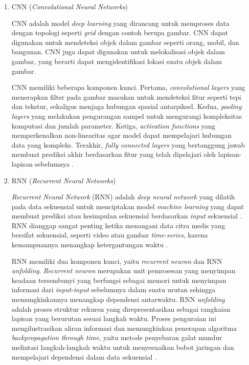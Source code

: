\begin{enumerate}
	\item CNN (\textit{Convolutional Neural Networks})
	
	CNN adalah model \textit{deep learning} yang dirancang untuk memproses data dengan topologi seperti \textit{grid} dengan contoh berupa gambar. CNN dapat digunakan untuk mendeteksi objek dalam gambar seperti orang, mobil, dan bangunan. CNN juga dapat digunakan untuk melokalisasi objek dalam gambar, yang berarti dapat mengidentifikasi lokasi suatu objek dalam gambar. 
	
	CNN memiliki beberapa komponen kunci. Pertama, \textit{convolutional layers} yang menerapkan filter pada gambar masukan untuk mendeteksi fitur seperti tepi dan tekstur, sekaligus menjaga hubungan spasial antarpiksel. Kedua, \textit{pooling layers} yang melakukan pengurangan sampel untuk mengurangi kompleksitas komputasi dan jumlah parameter. Ketiga, \textit{activation functions} yang memperkenalkan non-linearitas agar model dapat mempelajari hubungan data yang kompleks. Terakhir, \textit{fully connected layers} yang bertanggung jawab membuat prediksi akhir berdasarkan fitur yang telah dipelajari oleh lapisan-lapisan sebelumnya \autocite{gfg2020cnn}. 
	
	\item RNN (\textit{Recurrent Neural Networks}) 
	
	\textit{Recurrent Neural Network} (RNN) adalah \textit{deep neural network} yang dilatih pada data sekuensial untuk menciptakan model \textit{machine learning} yang dapat membuat prediksi atau kesimpulan sekuensial berdasarkan \textit{input} sekuensial \autocite{stryker2021rnn}.  RNN dianggap sangat penting ketika menangani data citra medis yang bersifat sekuensial, seperti video atau gambar \textit{time-series}, karena kemampuannya menangkap ketergantungan waktu \autocite{li2023medical}. 
	
	RNN memiliki dua komponen kunci, yaitu \textit{recurrent neuron} dan RNN \textit{unfolding}. \textit{Recurrent neuron} merupakan unit pemrosesan yang menyimpan keadaan tersembunyi yang berfungsi sebagai memori untuk menyimpan informasi dari \textit{input-input} sebelumnya dalam suatu urutan sehingga memungkinkannya menangkap dependensi antarwaktu. RNN \textit{unfolding} adalah proses struktur rekuren yang direpresentasikan sebagai rangkaian lapisan yang berurutan sesuai langkah waktu. Proses penguraian ini mengilustrasikan aliran informasi dan memungkinkan penerapan algoritma \textit{backpropagation through time}, yaitu metode penyebaran galat mundur melintasi langkah-langkah waktu untuk menyesuaikan bobot jaringan dan mempelajari dependensi dalam data sekuensial \autocite{stryker2021rnn}. 
	

\end{enumerate}
